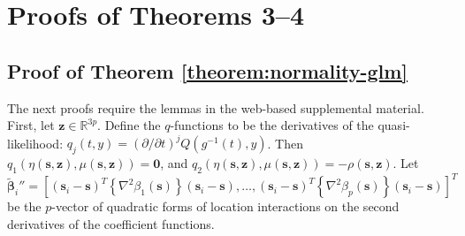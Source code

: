 \documentclass[authoryear,review, 12pt]{elsarticle}
\begin{document}
\section{Proofs of Theorems 3--4}
\subsection*{Proof of Theorem \ref{theorem:normality-glm}}
The next proofs require the lemmas in the web-based supplemental material.
First, let $\bm{z}\in\mathbb{R}^{3p}$. Define the $q$-functions
to be the derivatives of the quasi-likelihood: $q_{j}(t,y)=\left(\partial/\partial t\right)^{j}Q\left(g^{-1}(t),y\right)$.
Then $q_{1}\left(\eta\left(\bm{s},\bm{z}\right),\mu\left(\bm{s},\bm{z}\right)\right)=\bm{0}$,
and $q_{2}\left(\eta\left(\bm{s},\bm{z}\right),\mu\left(\bm{s},\bm{z}\right)\right)=-\rho\left(\bm{s},\bm{z}\right)$.
Let 
\[
\tilde{\bm{\beta}}_{i}''=\left[\left(\bm{s}_{i}-\bm{s}\right)^{T}\left\{ \nabla^{2}\beta_{1}(\bm{s})\right\} \left(\bm{s}_{i}-\bm{s}\right),\dots,\left(\bm{s}_{i}-\bm{s}\right)^{T}\left\{ \nabla^{2}\beta_{p}(\bm{s})\right\} \left(\bm{s}_{i}-\bm{s}\right)\right]^{T}
\]
 be the $p$-vector of quadratic forms of location interactions on
the second derivatives of the coefficient functions.
\end{document}
